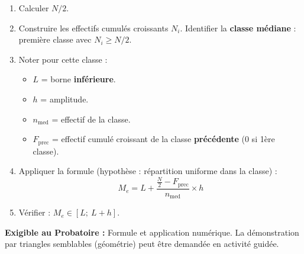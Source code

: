\documentclass[11pt]{article}
\begin{document}
\begin{methode}
\begin{enumerate}
    \item Calculer $N/2$.
    \item Construire les effectifs cumulés croissants $N_i$. Identifier la \textbf{classe médiane} : première classe avec $N_i \ge N/2$.
    \item Noter pour cette classe :
    \begin{itemize}
        \item $L$ = borne \textbf{inférieure}.
        \item $h$ = amplitude.
        \item $n_{\text{med}}$ = effectif de la classe.
        \item $F_{\text{prec}}$ = effectif cumulé croissant de la classe \textbf{précédente} ($0$ si 1ère classe).
    \end{itemize}
    \item Appliquer la formule (hypothèse : répartition uniforme dans la classe) :
    \[ \boxed{M_e = L + \frac{\frac{N}{2} - F_{\text{prec}}}{n_{\text{med}}} \times h} \]
    \item Vérifier : $M_e \in [L;\ L+h]$.
\end{enumerate}
\textbf{Exigible au Probatoire :} Formule et application numérique. La démonstration par triangles semblables (géométrie) peut être demandée en activité guidée.
\end{methode}
\end{document}
